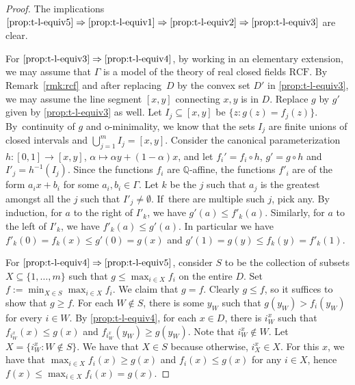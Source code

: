\documentclass[10pt]{amsart}
\theoremstyle{definition}
\theoremstyle{remark}
\let\oldimplies\implies
\renewcommand\implies{\mathchoice{\oldimplies}{\Rightarrow}{\Rightarrow}{\Rightarrow}}
\newcommand{\Q}{\mathbb Q}
\theoremstyle{plain}
\theoremstyle{definition}
\begin{document}
\begin{proof}
The implications $\eqref{prop:t-l-equiv5}\implies \eqref{prop:t-l-equiv1}\implies \eqref{prop:t-l-equiv2}\implies \eqref{prop:t-l-equiv3}$ are clear.

For $\eqref{prop:t-l-equiv3}\implies \eqref{prop:t-l-equiv4}$, by working in an elementary extension, we may assume that $\Gamma$ is a model of the theory of real closed fields $\mathrm{RCF}$. By Remark~\ref{rmk:rcf} and after replacing~$D$ by the convex set $D'$ in \eqref{prop:t-l-equiv3}, we may assume the line segment $[x,y]$ connecting $x,y$ is in $D$. Replace $g$ by $g'$ given by \eqref{prop:t-l-equiv3} as well. Let $I_j\subseteq [x,y]$ be $\{z: g(z)=f_j(z)\}$. By~continuity of $g$ and o-minimality, we know that the sets $I_j$ are finite unions of closed intervals and $\bigcup^m_{j=1} I_j=[x,y]$. Consider the canonical parameterization $h:[0,1]\to [x,y]$, $\alpha\mapsto \alpha y+(1-\alpha)x$, and let $f_i'=f_i\circ h$, $g'=g\circ h$ and $I'_j=h^{-1}(I_j)$. Since the functions $f_i$ are $\Q$-affine, the functions $f'_i$ are of the form $a_ix+b_i$ for some $a_i,b_i\in \Gamma$. Let $k$ be the $j$ such that $a_j$ is the greatest amongst all the $j$ such that $I'_j\neq \emptyset$. If~there are multiple such $j$, pick any. By induction, for $a$ to the right of $I'_k$, we have $g'(a)\leq f'_k(a)$. Similarly, for $a$ to the left of $I'_k$, we have $f'_k(a)\leq g'(a)$. In particular we have $f'_k(0)=f_k(x)\leq g'(0)=g(x)$ and $g'(1)=g(y)\leq f_k(y)=f'_k(1)$.

For $\eqref{prop:t-l-equiv4}\implies \eqref{prop:t-l-equiv5}$, consider $S$ to be the collection of subsets $X\subseteq \{1,\ldots,m\}$ such that $g\leq \max_{i\in X} f_i$ on the entire $D$.
Set $f:=\min_{X\in S}\max_{i\in X} f_i$.
We claim that $g= f$. Clearly $g\leq f$, so it suffices to show that $g\geq f$. For each $W\notin S$, there is some $y_W$ such that $g(y_W)>f_i(y_W)$ for
every $i \in W$. By \eqref{prop:t-l-equiv4}, for each $x\in D$, there is $i^x_{W}$ such that $f_{i^x_{W}}(x)\leq g(x)$ and $f_{i^x_W}(y_W)\geq g(y_W)$. Note that $i^x_W\notin W$. Let $X=\{i^x_W:W\notin S\}$. We have that $X\in S$ because otherwise, $i^x_X\in X$. For this $x$, we have that $\max_{i\in X} f_i(x)\geq g(x)$ and $f_i(x)\leq g(x)$ for any $i\in X$, hence $f(x)\leq \max_{i\in X} f_i(x)=g(x)$.
\end{proof}
\end{document}
